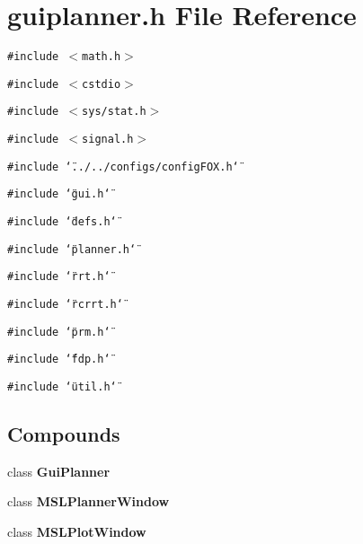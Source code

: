 \section{guiplanner.h File Reference}
\label{guiplanner_8h}
{\tt \#include $<$math.h$>$}\par
{\tt \#include $<$cstdio$>$}\par
{\tt \#include $<$sys/stat.h$>$}\par
{\tt \#include $<$signal.h$>$}\par
{\tt \#include \char`\"{}../../configs/config\-FOX.h\char`\"{}}\par
{\tt \#include \char`\"{}gui.h\char`\"{}}\par
{\tt \#include \char`\"{}defs.h\char`\"{}}\par
{\tt \#include \char`\"{}planner.h\char`\"{}}\par
{\tt \#include \char`\"{}rrt.h\char`\"{}}\par
{\tt \#include \char`\"{}rcrrt.h\char`\"{}}\par
{\tt \#include \char`\"{}prm.h\char`\"{}}\par
{\tt \#include \char`\"{}fdp.h\char`\"{}}\par
{\tt \#include \char`\"{}util.h\char`\"{}}\par
\subsection*{Compounds}
\begin{CompactItemize}
\item 
class {\bf Gui\-Planner}
\item 
class {\bf MSLPlanner\-Window}
\item 
class {\bf MSLPlot\-Window}
\end{CompactItemize}
